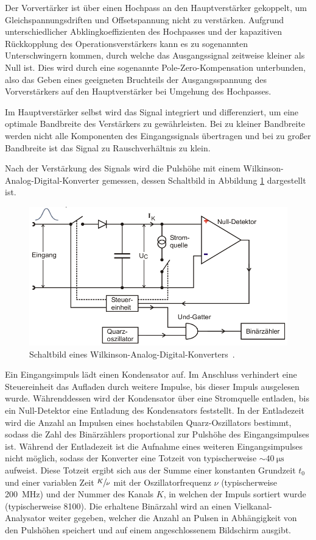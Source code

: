 Der Vorvertärker ist über einen Hochpass an den Hauptverstärker gekoppelt, um Gleichspannungsdriften
und Offsetspannung nicht zu verstärken. Aufgrund unterschiedlicher Abklingkoeffizienten des
Hochpasses und der kapazitiven Rückkopplung des Operationsverstärkers kann es zu sogenannten
Unterschwingern kommen, durch welche das Ausgangssignal zeitweise kleiner als Null ist. Dies
wird durch eine sogenannte Pole-Zero-Kompensation unterbunden, also das Geben eines geeigneten
Bruchteils der Ausgangsspannung des Vorverstärkers auf den Hauptverstärker bei Umgehung
des Hochpasses.

Im Hauptverstärker selbst wird das Signal integriert und differenziert,
um eine optimale Bandbreite des Verstärkers zu gewährleisten. Bei zu kleiner Bandbreite
werden nicht alle Komponenten des Eingangssignals übertragen und bei zu großer Bandbreite
ist das Signal zu Rauschverhältnis zu klein.

Nach der Verstärkung des Signals wird die Pulshöhe mit einem Wilkinson-Analog-Digital-Konverter
gemessen, dessen Schaltbild in Abbildung \ref{fig:Wilkinson-Analog-Digital-Konverter} dargestellt ist.
\begin{figure}
	\centering
	\includegraphics[width=.8\textwidth]{images/Wilkinson-AD-Konverter.pdf}
	\caption{Schaltbild eines Wilkinson-Analog-Digital-Konverters~\cite[21]{anleitung}.}
	\label{fig:Wilkinson-Analog-Digital-Konverter}
\end{figure}
Ein Eingangsimpuls lädt einen Kondensator auf. Im Anschluss verhindert eine Steuereinheit
das Aufladen durch weitere Impulse, bis dieser Impuls ausgelesen wurde.
Währenddessen wird der Kondensator über eine Stromquelle entladen, bis ein Null-Detektor eine
Entladung des Kondensators feststellt. In der Entladezeit wird die Anzahl an Impulsen eines
hochstabilen Quarz-Oszillators bestimmt, sodass die Zahl des Binärzählers proportional zur
Pulshöhe des Eingangsimpulses ist.
Während der Entladezeit ist die Aufnahme eines weiteren Eingangsimpulses nicht möglich,
sodass der Konverter eine Totzeit von typischerweise $\sim \SI{40}{\micro\second}$ aufweist.
Diese Totzeit ergibt sich aus der Summe einer konstanten Grundzeit $t_0$ und einer variablen
Zeit $\sfrac{K}{\nu}$ mit der Oszillatorfrequenz $\nu$
(typischerweise \SI{200}{\mega\hertz}) und der Nummer des Kanals $K$,
in welchen der Impuls sortiert wurde (typischerweise \num{8100}).
Die erhaltene Binärzahl wird an einen Vielkanal-Analysator weiter gegeben, welcher
die Anzahl an Pulsen in Abhängigkeit von den Pulshöhen speichert und auf einem angeschlossenem
Bildschirm ausgibt.

